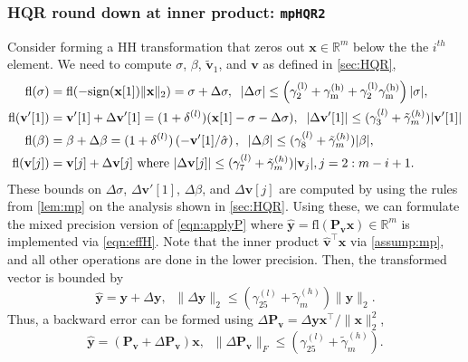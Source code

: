 \documentclass[review,onefignum,onetabnum]{siamart190516}
\newcommand{\R}{\mathbb{R}}
\newcommand{\dd}{\delta}
\newcommand{\bb}[1]{\mathbf{#1}}
\newcommand{\fl}{\mathrm{fl}}
\begin{document}
\subsubsection{HQR round down at inner product: {\tt mpHQR2}}
Consider forming a HH transformation that zeros out $\bb{x}\in\R^m$ below the the $i^{th}$ element. 
We need to compute $\sigma$, $\beta$, $\tilde{\bb{v}}_1$, and $\bb{v}$ as defined in \cref{sec:HQR},
\begin{align}
\fl(\sigma) &= \fl(-\rm{sign}(\bb{x}[1])\|\bb{x}\|_2) = \sigma + \Delta \sigma,\;\;|\Delta\sigma| \leq \left(\gamma_{2}^{(l)}+\gamma_{m}^{(h)}+\gamma_{2}^{(l)}\gamma_{m}^{(h)}\right)|\sigma|,\label{eqn:mpsigma}\\
\fl(\bb{v}'[1])& =\bb{v}'[1] + \Delta \bb{v}'[1] = (1+\dd^{(l)}) (\bb{x}[1]-\sigma-\Delta\sigma), \;\;|\Delta\bb{v}'[1]| \leq (\gamma_{3}^{(l)}+\tilde{\gamma}_{m}^{(h)})|\bb{v}'[1]| \label{eqn:mpv1}\\
\fl(\beta) &= \beta +\Delta \beta= (1+\dd^{(l)})\left(-\bb{v}'[1]/\hat{\sigma}\right), \;\; |\Delta\beta| \leq (\gamma_{8}^{(l)}+\tilde{\gamma}_{m}^{(h)})|\beta|, \label{eqn:mpbeta}\\
\fl(\bb{v}[j])	&= \bb{v}[j] + \Delta \bb{v}[j]\text{ where }|\Delta \bb{v}[j]|\leq 
(\gamma_{7}^{(l)} + \tilde{\gamma}_{m}^{(h)})|\bb{v}_j|,j=2:m-i+1 \label{eqn:mpv}.
\end{align}
These bounds on $\Delta\sigma$, $\Delta \bb{v}'[1]$, $\Delta \beta$, and $\Delta \bb{v}[j]$ are computed by using the rules from \cref{lem:mp} on the analysis shown in \cref{sec:HQR}.
Using these, we can formulate the mixed precision version of \cref{eqn:applyP} where $\hat{\bb{y}}=\fl(\bb{P_vx})\in\R^m$ is implemented via \cref{eqn:effH}.
Note that the inner product $\hat{\bb{v}}^{\top}\bb{x}$ via \cref{assump:mp}, and all other operations are done in the lower precision.
Then, the transformed vector is bounded by
\begin{equation}
\hat{\bb{y}} = \bb{y}+\Delta \bb{y},\;\; \|\Delta \bb{y}\|_2 \leq (\gamma_{25}^{(l)} + \tilde{\gamma}_{m}^{(h)})\|\bb{y}\|_2.\label{eqn:mpdelty}
\end{equation}
Thus, a backward error can be formed using $\Delta \bb{P_v} = \Delta \bb{y}\bb{x}^{
	\top}/\|\bb{x}\|_2^2$,
\begin{equation}
\hat{\bb{y}} = (\bb{P_v} + \Delta \bb{P_v})\bb{x},\;\; \|\Delta \bb{P_v}\|_F\leq (\gamma_{25}^{(l)} + \tilde{\gamma}_{m}^{(h)}). \label{eqn:mpapplyP}
\end{equation}
\end{document}
